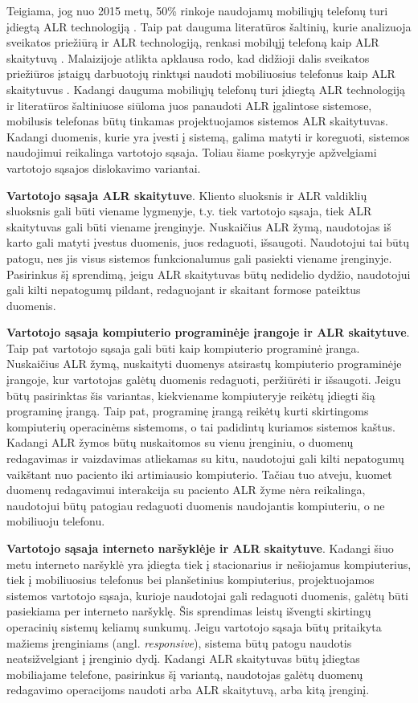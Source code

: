 Teigiama, jog nuo 2015 metų, 50\% rinkoje naudojamų mobiliųjų telefonų turi įdiegtą ALR technologiją \cite{forum2}. Taip pat dauguma literatūros šaltinių, kurie analizuoja sveikatos priežiūrą ir ALR technologiją, renkasi mobilųjį telefoną kaip ALR skaitytuvą \cite{Azlina2013} \cite{Strommer2006} \cite{Puma2012} \cite{Marcus} \cite{Gautam}. Malaizijoje atlikta apklausa rodo, kad didžioji dalis sveikatos priežiūros įstaigų darbuotojų rinktųsi naudoti mobiliuosius telefonus kaip ALR skaitytuvus \cite{Azlina2013}. Kadangi dauguma mobiliųjų telefonų turi įdiegtą ALR technologiją ir literatūros šaltiniuose siūloma juos panaudoti ALR įgalintose sistemose, mobilusis telefonas būtų tinkamas projektuojamos sistemos ALR skaitytuvas. Kadangi duomenis, kurie yra įvesti į sistemą, galima matyti ir koreguoti, sistemos naudojimui reikalinga vartotojo sąsaja. Toliau šiame poskyryje apžvelgiami vartotojo sąsajos dislokavimo variantai.

\textbf{Vartotojo sąsaja ALR skaitytuve}. Kliento sluoksnis ir ALR valdiklių sluoksnis gali būti viename lygmenyje, t.y. tiek vartotojo sąsaja, tiek ALR skaitytuvas gali būti viename įrenginyje. Nuskaičius ALR žymą, naudotojas iš karto gali matyti įvestus duomenis, juos redaguoti, išsaugoti. Naudotojui tai būtų patogu, nes jis visus sistemos funkcionalumus gali pasiekti viename įrenginyje. Pasirinkus šį sprendimą, jeigu ALR skaitytuvas būtų nedidelio dydžio, naudotojui gali kilti nepatogumų pildant, redaguojant ir skaitant formose pateiktus duomenis.

\textbf{Vartotojo sąsaja kompiuterio programinėje įrangoje ir ALR skaitytuve}. Taip pat vartotojo sąsaja gali būti kaip kompiuterio programinė įranga. Nuskaičius ALR žymą, nuskaityti duomenys atsirastų kompiuterio programinėje įrangoje, kur vartotojas galėtų duomenis redaguoti, peržiūrėti ir išsaugoti. Jeigu būtų pasirinktas šis variantas, kiekviename kompiuteryje reikėtų įdiegti šią programinę įrangą. Taip pat, programinę įrangą reikėtų kurti skirtingoms kompiuterių operacinėms sistemoms, o tai padidintų kuriamos sistemos kaštus. Kadangi ALR žymos būtų nuskaitomos su vienu įrenginiu, o duomenų redagavimas ir vaizdavimas atliekamas su kitu, naudotojui gali kilti nepatogumų vaikštant nuo paciento iki artimiausio kompiuterio. Tačiau tuo atveju, kuomet duomenų redagavimui interakcija su paciento ALR žyme nėra reikalinga, naudotojui būtų patogiau redaguoti duomenis naudojantis kompiuteriu, o ne mobiliuoju telefonu. 

\textbf{Vartotojo sąsaja interneto naršyklėje ir ALR skaitytuve}. Kadangi šiuo metu interneto naršyklė yra įdiegta tiek į stacionarius ir nešiojamus kompiuterius, tiek į mobiliuosius telefonus bei planšetinius kompiuterius, projektuojamos sistemos vartotojo sąsaja, kurioje naudotojai gali redaguoti duomenis, galėtų būti pasiekiama per interneto naršyklę. Šis sprendimas leistų išvengti skirtingų operacinių sistemų keliamų sunkumų. Jeigu vartotojo sąsaja būtų pritaikyta mažiems įrenginiams (angl. \textit{responsive}), sistema būtų patogu naudotis neatsižvelgiant į įrenginio dydį. Kadangi ALR skaitytuvas būtų įdiegtas mobiliajame telefone, pasirinkus šį variantą, naudotojas galėtų duomenų redagavimo operacijoms naudoti arba ALR skaitytuvą, arba kitą įrenginį. 


